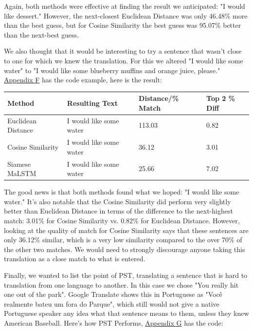 \documentclass[runningheads]{llncs}
\begin{document}
	Again, both methods were effective at finding the result we anticipated: "I would like dessert." However, the next-closest Euclidean Distance was only 46.48\% more than the best guess, but for Cosine Similarity the best guess was 95.07\% better than the next-best guess. 

	We also thought that it would be interesting to try a sentence that wasn't close to one for which we knew the translation. For this we altered "I would like some water" to "I would like some blueberry muffins and orange juice, please."  \hyperlink{Appendix F}{Appendix F} has the code example, here is the result:



\vspace{10 mm}
	\begin{minipage}{\linewidth}
			\begin{tabular}{| l | l | l | l |}
			  \hline			
			  Method & Resulting Text & Distance/\% Match & Top 2 \% Diff \\
			  \hline			
			  Euclidean Distance & I would like some water & 113.03 & 0.82 \\
			  \hline			
			  Cosine Similarity & I would like some water & 36.12 & 3.01 \\
			  \hline  
			  Siamese MaLSTM & I would like some water & 25.66 & 7.02 \\
			  \hline
			\end{tabular}
	\end{minipage}
	\afterpage{\clearpage}
\vspace{10 mm}


	The good news is that both methods found what we hoped: "I would like some water." It's also notable that the Cosine Similarity did perform very slightly better than Euclidean Distance in terms of the difference to the next-highest match: 3.01\% for Cosine Similarity vs. 0.82\% for Euclidean Distance. However, looking at the quality of match for Cosine Similarity says that these sentences are only 36.12\% similar, which is a very low similarity compared to the over 70\% of the other two matches. We would need to strongly discourage anyone taking this translation as a close match to what is entered.

	Finally, we wanted to list the point of PST, translating a sentence that is hard to translation from one language to another. In this case we chose "You really hit one out of the park". Google Translate shows this in Portuguese as "Você realmente bateu um fora do Parque", which still would not give a native Portuguese speaker any idea what that sentence means to them, unless they knew American Baseball. Here's how PST Performs, \hyperlink{Appendix G}{Appendix G} has the code:
\end{document}
